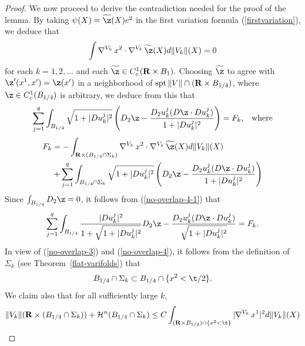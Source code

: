 \documentclass[a4paper,11pt]{amsart}
\begin{document}
\begin{proof}
We now proceed to derive the contradiction needed for the proof of the lemma. By taking $\psi(X) = \widetilde{\z}(X)e^{2}$ in the first variation formula (\ref{firstvariation}), we deduce that 
\begin{equation}\label{no-overlap-main}
\int \nabla^{V_{k}} \, x^{2} \cdot \nabla^{V_{k}} \,{\widetilde \z}(X) d\|V_{k}\|(X)= 0
\end{equation}
for each $k=1, 2, \ldots$ and each ${\widetilde \z} \in C^{1}_{c}({\mathbf R} \times B_{1}).$ Choosing ${\widetilde \z}$ 
to agree with $\z^{\prime}(x^{1}, x^{\prime}) = \z(x^{\prime})$ in a neighborhood of ${\rm spt} \,\|V\| \cap ({\mathbf R} \times B_{1/4})$, where 
$\z  \in C^{1}_{c}(B_{1/4})$ is arbitrary, we deduce from this that 
\begin{equation}\label{no-overlap-4-1}
\sum_{j=1}^{q}\int_{B_{1/4}}\sqrt{1 + |D{u}_{k}^{j}|^{2}}\left(D_{2}\z - \frac{D_{2}{u}_{k}^{j} (D\z \cdot D{u}_{k}^{j})}{1 + |D{u}_{k}^{j}|^{2}}\right) = F_{k}, \;\;\; \mbox{where}
\end{equation}
\begin{eqnarray*}
F_{k} = -\int_{{\mathbf R} \times (B_{1/4} \cap \Sigma_{k})} \nabla^{V_{k}} \, x^{2} \cdot \nabla^{V_{k}} \,{\widetilde \z}(X) d\|V_{k}\|(X) &&\\
&&\hspace{-3in}+ 
\sum_{j=1}^{q}\int_{B_{1/4} \cap \Sigma_{k}}\sqrt{1 + |D{u}_{k}^{j}|^{2}}\left(D_{2}\z - \frac{D_{2}{u}_{k}^{j} (D\z \cdot D{u}_{k}^{j})}{1 + |D{u}_{k}^{j}|^{2}}\right) 
\end{eqnarray*}
Since $\int_{B_{1/4}} D_{2} \z = 0$, it follows from (\ref{no-overlap-4-1}) that 
\begin{equation}\label{no-overlap-4-2}
\sum_{j=1}^{q}\int_{B_{1/4}}\frac{|D{u}_{k}^{j}|^{2}}{1 + \sqrt{1 + |D{u}_{k}^{j}|^{2}}} D_{2}\z - \frac{D_{2}{u}_{k}^{j} (D\z \cdot D{u}_{k}^{j})}{\sqrt{1 + |D{u}_{k}^{j}|^{2}}} = F_{k}.
\end{equation}
In view of  (\ref{no-overlap-3}) and (\ref{no-overlap-4}), it follows from  the definition of $\Sigma_{k}$ (see Theorem~\ref{flat-varifolds}) that
\begin{equation}\label{no-overlap-4-2-1}
B_{1/4} \cap \Sigma_{k} \subset B_{1/4} \cap \{x^{2} < \t/2\}.
\end{equation}
We claim also that for all sufficiently large $k$,
\begin{equation}\label{no-overlap-4-3}
\|V_{k}\|({\mathbf R} \times (B_{1/4} \cap \Sigma_{k})) + {\mathcal H}^{n}(B_{1/4} \cap  \Sigma_{k}) 
\leq C \int_{({\mathbf R} \times B_{1/2}) \cap \{x^{2} < \t\}} |\nabla^{V_{k}} \, x^{1}|^{2} d\|V_{k}\|(X)

\end{equation}
\end{proof}
\end{document}

